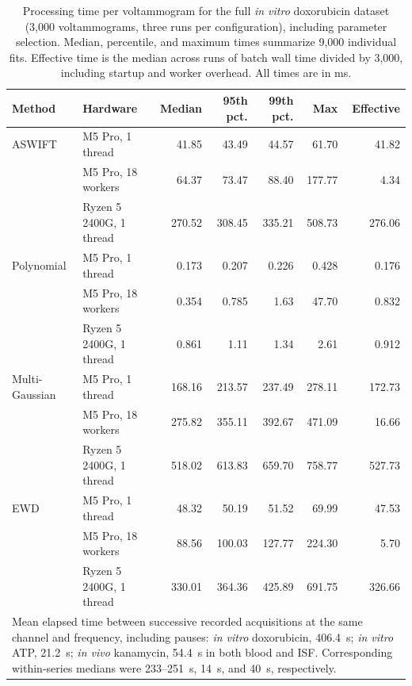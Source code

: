 \clearpage
\begin{table}[H]
  \centering
  \captionsetup{labelformat=revfig, labelsep=revspace}
  \caption[Processing time per voltammogram]{Processing time per voltammogram for the full \textsl{in vitro} doxorubicin dataset (3,000 voltammograms, three runs per configuration), including parameter selection. Median, percentile, and maximum times summarize 9,000 individual fits. Effective time is the median across runs of batch wall time divided by 3,000, including startup and worker overhead. All times are in ms.}
  \label{tab:s2}
  \small
  \setlength{\tabcolsep}{3pt}
  \renewcommand{\arraystretch}{1.2}
  \begin{tabular}{l l r r r r r}
    \hline
    Method & Hardware & Median & 95th pct. & 99th pct. & Max & Effective \\
    \hline
    ASWIFT & M5 Pro, 1 thread & 41.85 & 43.49 & 44.57 & 61.70 & 41.82 \\
     & M5 Pro, 18 workers & 64.37 & 73.47 & 88.40 & 177.77 & 4.34 \\
     & Ryzen 5 2400G, 1 thread & 270.52 & 308.45 & 335.21 & 508.73 & 276.06 \\
    Polynomial & M5 Pro, 1 thread & 0.173 & 0.207 & 0.226 & 0.428 & 0.176 \\
     & M5 Pro, 18 workers & 0.354 & 0.785 & 1.63 & 47.70 & 0.832 \\
     & Ryzen 5 2400G, 1 thread & 0.861 & 1.11 & 1.34 & 2.61 & 0.912 \\
    Multi-Gaussian & M5 Pro, 1 thread & 168.16 & 213.57 & 237.49 & 278.11 & 172.73 \\
     & M5 Pro, 18 workers & 275.82 & 355.11 & 392.67 & 471.09 & 16.66 \\
     & Ryzen 5 2400G, 1 thread & 518.02 & 613.83 & 659.70 & 758.77 & 527.73 \\
    EWD & M5 Pro, 1 thread & 48.32 & 50.19 & 51.52 & 69.99 & 47.53 \\
     & M5 Pro, 18 workers & 88.56 & 100.03 & 127.77 & 224.30 & 5.70 \\
     & Ryzen 5 2400G, 1 thread & 330.01 & 364.36 & 425.89 & 691.75 & 326.66 \\
    \hline
    \multicolumn{7}{p{0.9\linewidth}}{Mean elapsed time between successive recorded acquisitions at the same channel and frequency, including pauses: \textsl{in vitro} doxorubicin, 406.4~s; \textsl{in vitro} ATP, 21.2~s; \textsl{in vivo} kanamycin, 54.4~s in both blood and ISF. Corresponding within-series medians were 233--251~s, 14~s, and 40~s, respectively.} \\
  \end{tabular}
\end{table}

